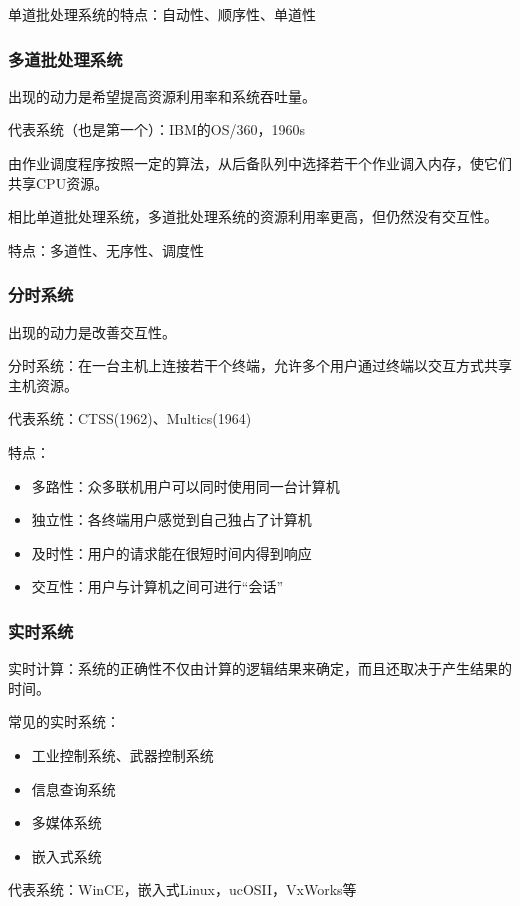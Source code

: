 \documentclass[12pt, a4paper, oneside]{ctexart}
\begin{document}
单道批处理系统的特点：自动性、顺序性、单道性

\subsubsection{多道批处理系统}

出现的动力是希望提高资源利用率和系统吞吐量。

代表系统（也是第一个）：IBM的OS/360，1960s

由作业调度程序按照一定的算法，从后备队列中选择若干个作业调入内存，使它们共享CPU资源。

相比单道批处理系统，多道批处理系统的资源利用率更高，但仍然没有交互性。

特点：多道性、无序性、调度性

\subsubsection{分时系统}

出现的动力是改善交互性。

分时系统：在一台主机上连接若干个终端，允许多个用户通过终端以交互方式共享主机资源。

代表系统：CTSS(1962)、Multics(1964)

特点：
\begin{itemize}
    \item 多路性：众多联机用户可以同时使用同一台计算机
    \item 独立性：各终端用户感觉到自己独占了计算机
    \item 及时性：用户的请求能在很短时间内得到响应
    \item 交互性：用户与计算机之间可进行“会话”
\end{itemize}

\subsubsection{实时系统}

实时计算：系统的正确性不仅由计算的逻辑结果来确定，而且还取决于产生结果的时间。

常见的实时系统：
\begin{itemize}
    \item 工业控制系统、武器控制系统
    \item 信息查询系统
    \item 多媒体系统
    \item 嵌入式系统
\end{itemize}

代表系统：WinCE，嵌入式Linux，ucOSII，VxWorks等
\end{document}
